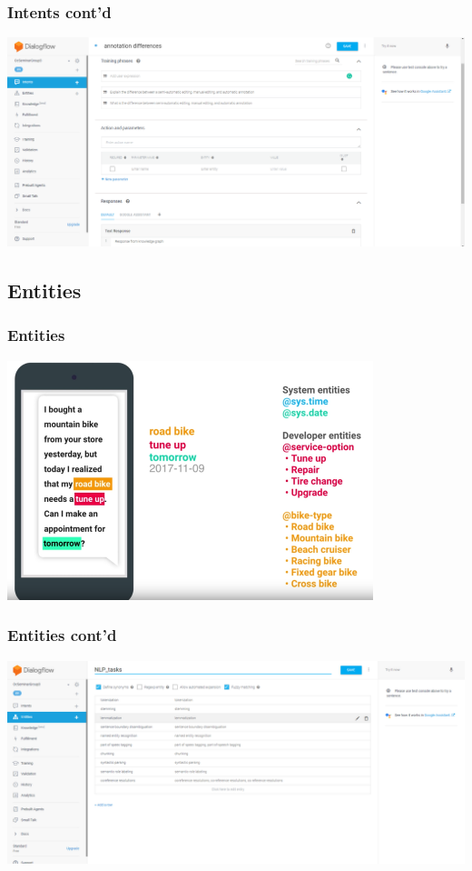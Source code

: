 \documentclass{beamer}
\begin{document}
\begin{frame}
\frametitle{Intents cont'd}
\begin{center}
\includegraphics[width=\textwidth]{pictures/intents.png}

\end{center}
\end{frame}


\subsection{Entities}

\begin{frame}
\frametitle{Entities}
\begin{center}
\includegraphics[width=0.8\textwidth]{pictures/entities2.png}
\end{center}
\end{frame}

\begin{frame}
\frametitle{Entities cont'd}
\begin{center}
\includegraphics[width=\textwidth]{pictures/entities.png}
\end{center}
\end{frame}
\end{document}

